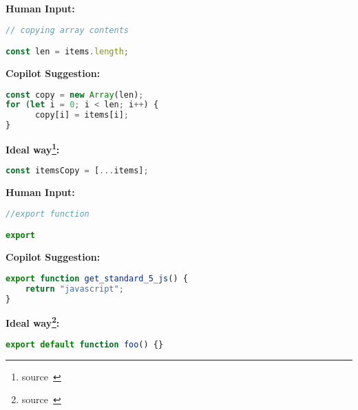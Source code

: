 \begin{tcolorbox}[title=copying array contents,boxsep=.5mm]
\textbf{Human Input:}
\begin{lstlisting}[language=JavaScript]
// copying array contents

const len = items.length;
\end{lstlisting}
\tcbline
\textbf{Copilot Suggestion:}
\begin{lstlisting}[language=JavaScript, escapechar=\%]
const copy = new Array(len);
for (let i = 0; i < len; i++) {
	  copy[i] = items[i];
}
\end{lstlisting}
\tcbline
\textbf{Ideal way\footnote{source~\cite{airbnb_code}}:}
\begin{lstlisting}[language=JavaScript]
const itemsCopy = [...items];
\end{lstlisting}
\end{tcolorbox}


\begin{tcolorbox}[title=Export function,boxsep=.5mm]
\textbf{Human Input:}
\begin{lstlisting}[language=JavaScript]
//export function

export 
\end{lstlisting}
\tcbline
\textbf{Copilot Suggestion:}
\begin{lstlisting}[language=JavaScript, escapechar=\%]
export function get_standard_5_js() {
    return "javascript";
}
\end{lstlisting}
\tcbline
\textbf{Ideal way\footnote{source~\cite{airbnb_code}}:}
\begin{lstlisting}[language=JavaScript]
export default function foo() {}
\end{lstlisting}
\end{tcolorbox}
